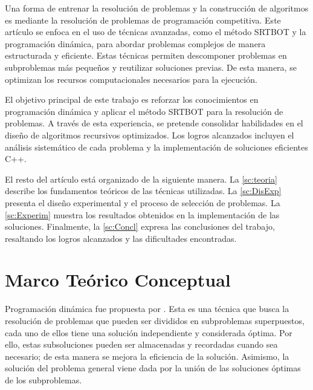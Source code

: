 \documentclass[a4paper, 12pt]{article}
\begin{document}
Una forma de entrenar la resolución de problemas y la construcción de algoritmos es mediante la resolución de problemas de programación competitiva. Este artículo se enfoca en el uso de técnicas avanzadas, como el método SRTBOT y la programación dinámica, para abordar problemas complejos de manera estructurada y eficiente. Estas técnicas permiten descomponer problemas en subproblemas más pequeños y reutilizar soluciones previas. De esta manera, se optimizan los recursos computacionales necesarios para la ejecución.

El objetivo principal de este trabajo es reforzar los conocimientos en programación dinámica y aplicar el método SRTBOT para la resolución de problemas. A través de esta experiencia, se pretende consolidar habilidades en el diseño de algoritmos recursivos optimizados. Los logros alcanzados incluyen el análisis sistemático de cada problema y la implementación de soluciones eficientes C++.

El resto del artículo está organizado de la siguiente manera. La \autoref{sc:teoria} describe los fundamentos teóricos de las técnicas utilizadas. La \autoref{sc:DisExp} presenta el diseño experimental y el proceso de selección de problemas. La \autoref{sc:Experim} muestra los resultados obtenidos en la implementación de las soluciones. Finalmente, la \autoref{sc:Concl} expresa las conclusiones del trabajo, resaltando los logros alcanzados y las dificultades encontradas.

\section{Marco Teórico Conceptual}
\label{sc:teoria}


Programación dinámica fue propuesta por \citet{bellman1952theory}.
Esta es una técnica que busca la resolución de problemas que pueden ser divididos en subproblemas superpuestos, cada uno de ellos tiene una solución independiente y considerada óptima. Por ello, estas subsoluciones pueden ser almacenadas y recordadas cuando sea necesario; de esta manera se mejora la eficiencia de la solución. Asimismo, la solución del problema general viene dada por la unión de las soluciones óptimas de los subproblemas.
\end{document}
